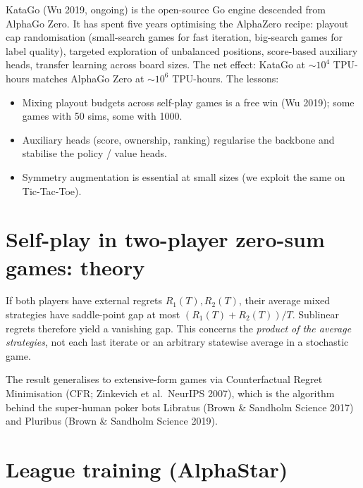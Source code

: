 \documentclass[11pt,oneside]{scrbook}
\begin{document}
KataGo (Wu 2019, ongoing) is the open-source Go engine descended from
AlphaGo Zero. It has spent five years optimising the AlphaZero recipe:
playout cap randomisation (small-search games for fast iteration,
big-search games for label quality), targeted exploration of
unbalanced positions, score-based auxiliary heads, transfer learning
across board sizes. The net effect: KataGo at $\sim 10^4$ TPU-hours
matches AlphaGo Zero at $\sim 10^6$ TPU-hours. The lessons:
\begin{itemize}\setlength\itemsep{1pt}
  \item Mixing playout budgets across self-play games is a free win
        (Wu 2019); some games with 50 sims, some with 1000.
  \item Auxiliary heads (score, ownership, ranking) regularise the
        backbone and stabilise the policy / value heads.
  \item Symmetry augmentation is essential at small sizes (we exploit
        the same on Tic-Tac-Toe).
\end{itemize}

\section{Self-play in two-player zero-sum games: theory}

\begin{proposition}
If both players have external regrets $R_1(T),R_2(T)$, their average
mixed strategies have saddle-point gap at most
$(R_1(T)+R_2(T))/T$. Sublinear regrets therefore yield a vanishing gap.
This concerns the \emph{product of the average strategies}, not each
last iterate or an arbitrary statewise average in a stochastic game.
\end{proposition}



The result generalises to extensive-form games via Counterfactual Regret
Minimisation (CFR; Zinkevich et al.\ NeurIPS 2007), which is the
algorithm behind the super-human poker bots Libratus (Brown \& Sandholm
Science 2017) and Pluribus (Brown \& Sandholm Science 2019).

\section{League training (AlphaStar)}
\end{document}

